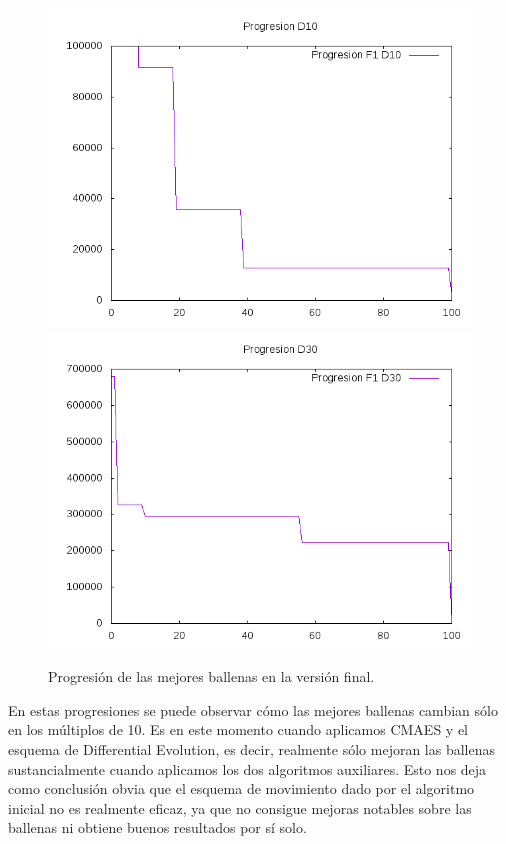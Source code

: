 \documentclass[12pt,a4paper]{article}
\begin{document}
	\begin{figure}[!h]
		\includegraphics[scale=0.5]{../Algoritmo/resultados/Imagenes/Progresion/progresion_mejores_10.png}
		\includegraphics[scale=0.5]{../Algoritmo/resultados/Imagenes/Progresion/progresion_mejores_30.png}
		\caption{Progresión de las mejores ballenas en la versión final.}
	\end{figure}

	En estas progresiones se puede observar cómo las mejores ballenas cambian sólo en los múltiplos de 10. Es en este momento cuando aplicamos CMAES y el esquema de Differential Evolution, es decir, realmente sólo mejoran las ballenas sustancialmente cuando aplicamos los dos algoritmos auxiliares. Esto nos deja como conclusión obvia que el esquema de movimiento dado por el algoritmo inicial no es realmente eficaz, ya que no consigue mejoras notables sobre las ballenas ni obtiene buenos resultados por sí solo.
	
\end{document}
